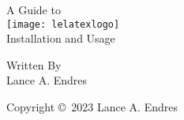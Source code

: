 
\hypersetup{pageanchor=false}
\begin{titlepage}
\thispagestyle{ledateinfooter}
\begin{center}
\bfseries

\LARGE A Guide to\\
\vspace{10pt}
\texttt{[image: lelatexlogo]}\\
\LARGE Installation and Usage\\

\vfill

\large Written By\\
\Large Lance A. Endres\\

\vfill

\normalsize Copyright \copyright\ 2023 Lance A. Endres

\end{center}
\end{titlepage}

\hypersetup{pageanchor=true} 